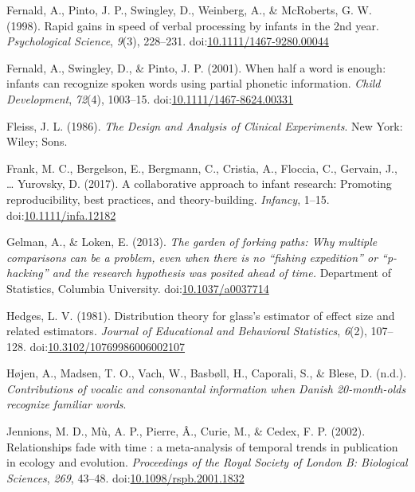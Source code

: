 \documentclass[man]{apa6}
\theoremstyle{definition}
\theoremstyle{definition}
\theoremstyle{definition}
\theoremstyle{remark}
\begin{document}
\hypertarget{ref-Fernald1998}{}
Fernald, A., Pinto, J. P., Swingley, D., Weinberg, A., \& McRoberts, G.
W. (1998). Rapid gains in speed of verbal processing by infants in the
2nd year. \emph{Psychological Science}, \emph{9}(3), 228--231.
doi:\href{https://doi.org/10.1111/1467-9280.00044}{10.1111/1467-9280.00044}

\hypertarget{ref-Fernald2001a}{}
Fernald, A., Swingley, D., \& Pinto, J. P. (2001). When half a word is
enough: infants can recognize spoken words using partial phonetic
information. \emph{Child Development}, \emph{72}(4), 1003--15.
doi:\href{https://doi.org/10.1111/1467-8624.00331}{10.1111/1467-8624.00331}

\hypertarget{ref-Fleiss1986}{}
Fleiss, J. L. (1986). \emph{The Design and Analysis of Clinical
Experiments}. New York: Wiley; Sons.

\hypertarget{ref-Frank2017}{}
Frank, M. C., Bergelson, E., Bergmann, C., Cristia, A., Floccia, C.,
Gervain, J., \ldots{} Yurovsky, D. (2017). A collaborative approach to
infant research: Promoting reproducibility, best practices, and
theory-building. \emph{Infancy}, 1--15.
doi:\href{https://doi.org/10.1111/infa.12182}{10.1111/infa.12182}

\hypertarget{ref-Gelman2013}{}
Gelman, A., \& Loken, E. (2013). \emph{The garden of forking paths: Why
multiple comparisons can be a problem, even when there is no ``fishing
expedition'' or ``p-hacking'' and the research hypothesis was posited
ahead of time.} Department of Statistics, Columbia University.
doi:\href{https://doi.org/10.1037/a0037714}{10.1037/a0037714}

\hypertarget{ref-Hedges1981}{}
Hedges, L. V. (1981). Distribution theory for glass's estimator of
effect size and related estimators. \emph{Journal of Educational and
Behavioral Statistics}, \emph{6}(2), 107--128.
doi:\href{https://doi.org/10.3102/10769986006002107}{10.3102/10769986006002107}

\hypertarget{ref-Hojen}{}
Højen, A., Madsen, T. O., Vach, W., Basbøll, H., Caporali, S., \& Blese,
D. (n.d.). \emph{Contributions of vocalic and consonantal information
when Danish 20-month-olds recognize familiar words}.

\hypertarget{ref-Jennions2002}{}
Jennions, M. D., Mù, A. P., Pierre, Â., Curie, M., \& Cedex, F. P.
(2002). Relationships fade with time : a meta-analysis of temporal
trends in publication in ecology and evolution. \emph{Proceedings of the
Royal Society of London B: Biological Sciences}, \emph{269}, 43--48.
doi:\href{https://doi.org/10.1098/rspb.2001.1832}{10.1098/rspb.2001.1832}
\end{document}
